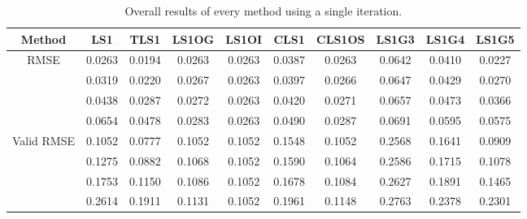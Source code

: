 \begin{table}[ht!]
\centering
\begin{tabular}{c|c|c|c|c|c|c|c|c|c}
Method & \scriptsize{LS1} & \scriptsize{TLS1} & \scriptsize{LS1OG} & \scriptsize{LS1OI} & \scriptsize{CLS1} & \scriptsize{CLS1OS} & \scriptsize{LS1G3} & \scriptsize{LS1G4} & \scriptsize{LS1G5}\\ \hline 
\multirow{4}{*}{RMSE} & 0.0263 & 0.0194 & 0.0263 & 0.0263 & 0.0387 & 0.0263 & 0.0642 & 0.0410 & 0.0227 \\ 
 & 0.0319 & 0.0220 & 0.0267 & 0.0263 & 0.0397 & 0.0266 & 0.0647 & 0.0429 & 0.0270 \\ 
 & 0.0438 & 0.0287 & 0.0272 & 0.0263 & 0.0420 & 0.0271 & 0.0657 & 0.0473 & 0.0366 \\ 
 & 0.0654 & 0.0478 & 0.0283 & 0.0263 & 0.0490 & 0.0287 & 0.0691 & 0.0595 & 0.0575 \\ 
 \hline
\multirow{4}{*}{Valid RMSE} & 0.1052 & 0.0777 & 0.1052 & 0.1052 & 0.1548 & 0.1052 & 0.2568 & 0.1641 & 0.0909 \\ 
 & 0.1275 & 0.0882 & 0.1068 & 0.1052 & 0.1590 & 0.1064 & 0.2586 & 0.1715 & 0.1078 \\ 
 & 0.1753 & 0.1150 & 0.1086 & 0.1052 & 0.1678 & 0.1084 & 0.2627 & 0.1891 & 0.1465 \\ 
 & 0.2614 & 0.1911 & 0.1131 & 0.1052 & 0.1961 & 0.1148 & 0.2763 & 0.2378 & 0.2301 \\ 
 \hline 
\end{tabular}
\caption{Overall results of every method using a single iteration.}
\label{tab:1it}
\end{table}


